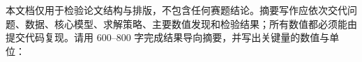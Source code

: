 本文档仅用于检验论文结构与排版，不包含任何赛题结论。摘要写作应依次交代问题、数据、核心模型、求解策略、主要数值发现和检验结果；所有数值都必须能由提交代码复现。请用 600--800 字完成结果导向摘要，并写出关键量的数值与单位：

